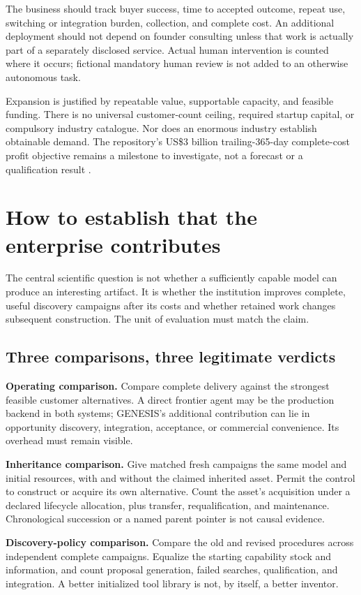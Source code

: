 \documentclass[11pt,letterpaper]{article}
\theoremstyle{remark}\newtheorem{remark}{Remark}[section]
\begin{document}
The business should track buyer success, time to accepted outcome, repeat use, switching or integration burden, collection, and complete cost. An additional deployment should not depend on founder consulting unless that work is actually part of a separately disclosed service. Actual human intervention is counted where it occurs; fictional mandatory human review is not added to an otherwise autonomous task.

Expansion is justified by repeatable value, supportable capacity, and feasible funding. There is no universal customer-count ceiling, required startup capital, or compulsory industry catalogue. Nor does an enormous industry establish obtainable demand. The repository's US\$3 billion trailing-365-day complete-cost profit objective remains a milestone to investigate, not a forecast or a qualification result \citep{lab2026}.

\section{How to establish that the enterprise contributes}\label{sec:evaluation}
The central scientific question is not whether a sufficiently capable model can produce an interesting artifact. It is whether the institution improves complete, useful discovery campaigns after its costs and whether retained work changes subsequent construction. The unit of evaluation must match the claim.

\subsection{Three comparisons, three legitimate verdicts}
\textbf{Operating comparison.} Compare complete delivery against the strongest feasible customer alternatives. A direct frontier agent may be the production backend in both systems; GENESIS's additional contribution can lie in opportunity discovery, integration, acceptance, or commercial convenience. Its overhead must remain visible.

\textbf{Inheritance comparison.} Give matched fresh campaigns the same model and initial resources, with and without the claimed inherited asset. Permit the control to construct or acquire its own alternative. Count the asset's acquisition under a declared lifecycle allocation, plus transfer, requalification, and maintenance. Chronological succession or a named parent pointer is not causal evidence.

\textbf{Discovery-policy comparison.} Compare the old and revised procedures across independent complete campaigns. Equalize the starting capability stock and information, and count proposal generation, failed searches, qualification, and integration. A better initialized tool library is not, by itself, a better inventor.
\end{document}
